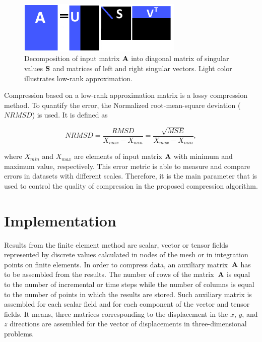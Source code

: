 \begin{figure}[H]
\centering
\includegraphics[width=0.7\textwidth]{figures/chapter-SVD/low_rank_decomposition_diagram}
\decoRule
\caption[Singular value decomposition illustration.]{Decomposition of input matrix $\mathbf{A}$ into diagonal matrix of singular values $\mathbf{S}$ and matrices of left and right singular vectors. Light color illustrates low-rank approximation.}
\label{fig:lowrank_svd}
\end{figure}


Compression based on a low-rank approximation matrix is a lossy compression method. To quantify the error, the Normalized root-mean-square deviation ($\mathit{NRMSD}$) is used. It is defined as

\begin{equation}
\mathit{NRMSD} = \frac{\mathit{RMSD}}{X_{max}-X_{min}}=\frac{\sqrt{\mathit{MSE}}}{X_{max}-X_{min}},
\label{eq:nrmsd-def}
\end{equation}

\noindent
where $X_{min}$ and $X_{max}$ are elements of input matrix $\mathbf{A}$ with minimum and maximum value, respectively. This error metric is able to measure and compare errors in datasets with different scales. Therefore, it is the main parameter that is used to control the quality of compression in the proposed compression algorithm.

\section{Implementation}

Results from the finite element method are scalar, vector or tensor fields represented by discrete values calculated in nodes of the mesh or in integration points on finite elements. In order to compress data, an auxiliary matrix~$\mathbf{A}$ has to be assembled from the results. The number of rows of the matrix~$\mathbf{A}$ is equal to the number of incremental or time steps while the number of columns is equal to the number of points in which the results are stored. Such auxiliary matrix is assembled for each scalar field and for each component of the vector and tensor fields. It means, three matrices corresponding to the displacement in the $x$, $y$, and $z$ directions are assembled for the vector of displacements in three-dimensional problems.

